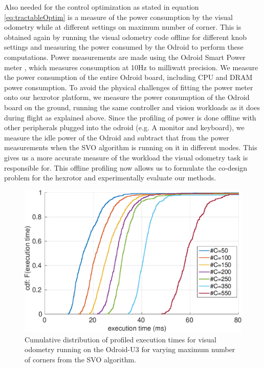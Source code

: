 Also needed for the control optimization as stated in equation \ref{eq:tractableOptim} is a measure of the power consumption by the visual odometry while at different settings on maximum number of corner. This is obtained again by running the visual odometry code offline for different knob settings and measuring the power consumed by the Odroid to perform these computations. Power measurements are made using the Odroid Smart Power meter \cite{OdroidSmartPower}, which measures consumption at 10Hz to milliwatt precision. We measure the power consumption of the entire Odroid board, including CPU and DRAM power consumption. To avoid the physical challenges of fitting the power meter onto our hexrotor platform, we measure the power consumption of the Odroid board on the ground, running the same controller and vision workloads as it does during flight as explained above. Since the profiling of power is done offline with other peripherals plugged into the odroid (e.g. A monitor and keyboard), we measure the idle power of the Odroid and subtract that from the power measurements when the SVO algorithm is running on it in different modes. This gives us a more accurate measure of the workload the visual odometry task is responsible for. This offline profiling now allows us to formulate the co-design problem for the hexrotor and experimentally evaluate our methods.


\begin{figure}[htbp]
  \centering
  \includegraphics[width=0.9\columnwidth]{figures/time_ecdf_millisec.pdf}
  \caption{Cumulative distribution of profiled execution times for visual odometry running on the Odroid-U3 for varying maximum number of corners from the SVO algorithm.}
  \label{fig:time_ecdf}
\end{figure}






